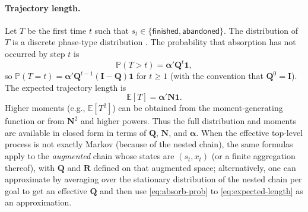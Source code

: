 \paragraph{Trajectory length.}
Let $T$ be the first time $t$ such that $s_t \in \{\mathsf{finished},\mathsf{abandoned}\}$. The distribution of $T$ is a discrete phase-type distribution \citep{neuts1981matrix}. The probability that absorption has not occurred by step $t$ is
\begin{equation}
  \mathbb{P}(T > t) = \boldsymbol{\alpha}' \mathbf{Q}^t \mathbf{1}, \label{eq:survival}
\end{equation}
so $\mathbb{P}(T = t) = \boldsymbol{\alpha}' \mathbf{Q}^{t-1}(\mathbf{I}-\mathbf{Q})\mathbf{1}$ for $t \geq 1$ (with the convention that $\mathbf{Q}^0 = \mathbf{I}$). The expected trajectory length is
\begin{equation}
  \mathbb{E}[T] = \boldsymbol{\alpha}' \mathbf{N} \mathbf{1}. \label{eq:expected-length}
\end{equation}
Higher moments (e.g., $\mathbb{E}[T^2]$) can be obtained from the moment-generating function or from $\mathbf{N}^2$ and higher powers. Thus the full distribution and moments are available in closed form in terms of $\mathbf{Q}$, $\mathbf{N}$, and $\boldsymbol{\alpha}$. When the effective top-level process is not exactly Markov (because of the nested chain), the same formulas apply to the \emph{augmented} chain whose states are $(s_t, x_t)$ (or a finite aggregation thereof), with $\mathbf{Q}$ and $\mathbf{R}$ defined on that augmented space; alternatively, one can approximate by averaging over the stationary distribution of the nested chain per goal to get an effective $\mathbf{Q}$ and then use \eqref{eq:absorb-prob} to \eqref{eq:expected-length} as an approximation.

